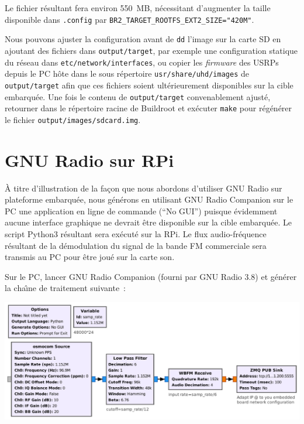 \documentclass[a4paper]{article}
\begin{document}
Le fichier r\'esultant fera environ 550~MB, n\'ecessitant d'augmenter la taille disponible dans {\tt .config}
par {\tt BR2\_TARGET\_ROOTFS\_EXT2\_SIZE="420M"}.

Nous pouvons ajuster la configuration avant de {\tt dd} l'image sur la carte SD en ajoutant des fichiers
dans {\tt output/target}, par exemple une configuration statique du r\'eseau dans {\tt etc/network/interfaces},
ou copier les {\em firmware} des USRPs depuis le PC h\^ote dans le sous r\'epertoire {\tt usr/share/uhd/images}
de {\tt output/target} afin que ces fichiers soient ult\'erieurement disponibles sur la cible embarqu\'ee. Une fois
le contenu de {\tt output/target} convenablement ajust\'e, retourner dans le r\'epertoire racine de Buildroot
et ex\'ecuter {\tt make} pour r\'eg\'en\'erer le fichier {\tt output/images/sdcard.img}.

\section{GNU Radio sur RPi}

\`A titre d'illustration de la fa\c con que nous abordons d'utiliser GNU Radio sur plateforme
embarqu\'ee, nous g\'en\'erons en utilisant GNU Radio Companion sur le PC une application
en ligne de commande (``No GUI'') puisque \'evidemment aucune interface graphique ne devrait
\^etre disponible sur la cible embarqu\'ee. Le script Python3 r\'esultant sera ex\'ecut\'e sur
la RPi. Le flux audio-fr\'equence r\'esultant de la d\'emodulation du signal de la bande FM 
commerciale sera transmis au PC pour \^etre jou\'e sur la carte son.

Sur le PC, lancer GNU Radio Companion (fourni par GNU Radio 3.8) et g\'en\'erer la cha\^\i ne 
de traitement suivante~:

\includegraphics[width=\linewidth]{target}
\end{document}
